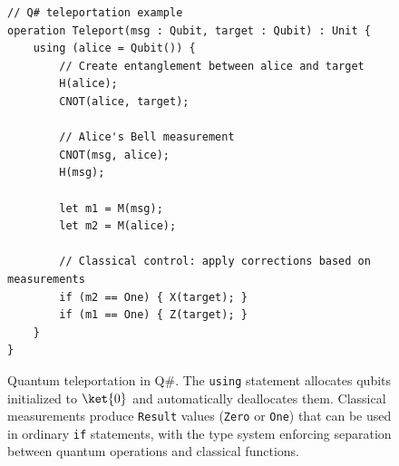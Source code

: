 \begin{figure}[t]
\begin{verbatim}
// Q# teleportation example
operation Teleport(msg : Qubit, target : Qubit) : Unit {
    using (alice = Qubit()) {
        // Create entanglement between alice and target
        H(alice);
        CNOT(alice, target);
        
        // Alice's Bell measurement
        CNOT(msg, alice);
        H(msg);
        
        let m1 = M(msg);
        let m2 = M(alice);
        
        // Classical control: apply corrections based on measurements
        if (m2 == One) { X(target); }
        if (m1 == One) { Z(target); }
    }
}
\end{verbatim}
\caption{Quantum teleportation in Q\#. The \texttt{using} statement allocates qubits initialized to $\ket{0}$ and automatically deallocates them. Classical measurements produce \texttt{Result} values (\texttt{Zero} or \texttt{One}) that can be used in ordinary \texttt{if} statements, with the type system enforcing separation between quantum operations and classical functions.}
\label{fig:qsharp-teleport}
\end{figure}
